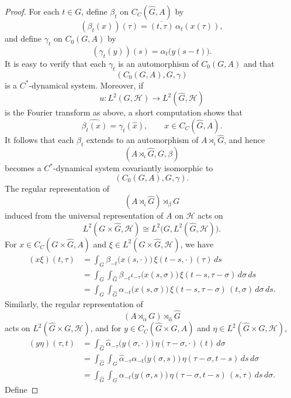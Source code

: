 \documentclass{book}
\begin{document}
\begin{proof} For each \(t\in G\), define \(\beta_t\) on \(C_C(\widehat G,A)\) by
  \[ (\beta_t(x))(\tau) = \overline{(t,\tau)}\,\alpha_t(x(\tau)), \]   
  and define \(\gamma_t\) on \(C_0(G,A)\) by 
  \[ (\gamma_t(y))(s) = \alpha_t\bigl(y(s-t)\bigr). \] 
  It is easy to verify that each \(\gamma_t\) is an automorphism of \(C_0(G,A)\) and that 
  \[ (C_0(G,A),G,\gamma) \] is a \(C^*\)-dynamical system. Moreover, if 
  \[ u:L^2(G,\mathcal{H})\longrightarrow L^2(\widehat G,\mathcal{H}) \] is the Fourier transform as above,
  a short computation shows that 
  \[ \hat{\beta_t(x)} = \gamma_t(\hat x), \qquad x\in C_C(\hat G,A). \]
  It follows that each \(\beta_t\) extends to an automorphism of \(A\rtimes_\iota\widehat G\), and hence
  \[ (A\rtimes_\iota\widehat G,G,\beta) \] becomes a \(C^*\)-dynamical system covariantly isomorphic to
  \[ (C_0(G,A),G,\gamma). \] The regular representation of 
  \[ (A\rtimes_\iota\widehat G)\rtimes_\beta G \] induced from the universal representation of \(A\) on \(\mathcal H\) acts on
  \[ L^2(G\times\widehat G,\mathcal H) \cong L^2\bigl(G,L^2(\widehat G,\mathcal H)\bigr). \]
  For \(x\in C_C(G\times\widehat G,A)\) and \(\xi\in L^2(G\times\widehat G,\mathcal H)\), we have
  \begin{align*} (x\xi)(t,\tau) &= \int_G \beta_{-t}\bigl(x(s,\cdot)\bigr) \,\xi(t-s,\cdot)(\tau)\,ds \\ 
    &= \int_G \int_{\widehat G} \beta_{-t}\iota_{-\tau}\bigl(x(s,\sigma)\bigr) \,\xi(t-s,\tau-\sigma)\,d\sigma\,ds \\
    &= \int_G \int_{\widehat G} \alpha_{-t}\bigl(x(s,\sigma)\bigr) \,\xi(t-s,\tau-\sigma)\, (t,\sigma)\,d\sigma\,ds .
  \end{align*} 
  Similarly, the regular representation of 
  \[ (A\rtimes_\alpha G)\rtimes_{\hat\alpha}\widehat G \] acts on \(L^2(\widehat G\times G,\mathcal H)\), and for
  \(y\in C_C(\widehat G\times G,A)\) and \(\eta\in L^2(\widehat G\times G,\mathcal H)\),
  \begin{align*} 
    (y\eta)(\tau,t) &= \int_{\widehat G} \hat\alpha_{-\tau}\bigl(y(\sigma,\cdot)\bigr) \,\eta(\tau-\sigma,\cdot)(t)\,d\sigma \\
    &= \int_{\widehat G}\int_G \hat\alpha_{-\tau}\alpha_{-t} \bigl(y(\sigma,s)\bigr) \,\eta(\tau-\sigma,t-s)\,ds\,d\sigma \\
    &= \int_{\widehat G}\int_G \alpha_{-t}\bigl(y(\sigma,s)\bigr) \,\eta(\tau-\sigma,t-s)\, \overline{(s,\tau)}\,ds\,d\sigma .
  \end{align*} 
  Define 

\end{proof}
\end{document}

